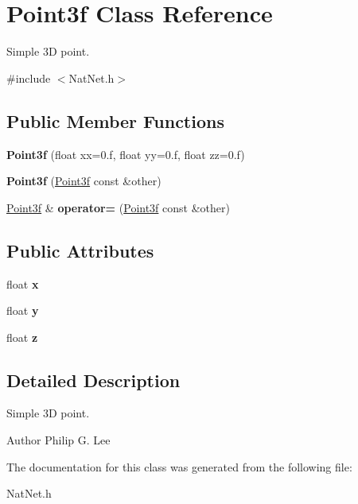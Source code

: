 \hypertarget{classPoint3f}{\section{\-Point3f \-Class \-Reference}
\label{classPoint3f}
}


\-Simple 3\-D point.  




{\ttfamily \#include $<$\-Nat\-Net.\-h$>$}

\subsection*{\-Public \-Member \-Functions}
\begin{DoxyCompactItemize}
\item 
\hypertarget{classPoint3f_a4fa6a4e68ec205c552892694fcef177f}{{\bfseries \-Point3f} (float xx=0.f, float yy=0.f, float zz=0.f)}\label{classPoint3f_a4fa6a4e68ec205c552892694fcef177f}

\item 
\hypertarget{classPoint3f_ae47b8c99eb19855964d305b5b676852d}{{\bfseries \-Point3f} (\hyperlink{classPoint3f}{\-Point3f} const \&other)}\label{classPoint3f_ae47b8c99eb19855964d305b5b676852d}

\item 
\hypertarget{classPoint3f_ac060b6f61dd759362eea8fc9d0507243}{\hyperlink{classPoint3f}{\-Point3f} \& {\bfseries operator=} (\hyperlink{classPoint3f}{\-Point3f} const \&other)}\label{classPoint3f_ac060b6f61dd759362eea8fc9d0507243}

\end{DoxyCompactItemize}
\subsection*{\-Public \-Attributes}
\begin{DoxyCompactItemize}
\item 
\hypertarget{classPoint3f_abfc744e013ce815faa5020f095675dd4}{float {\bfseries x}}\label{classPoint3f_abfc744e013ce815faa5020f095675dd4}

\item 
\hypertarget{classPoint3f_a7fb932f23a99ead4e754df956dd61600}{float {\bfseries y}}\label{classPoint3f_a7fb932f23a99ead4e754df956dd61600}

\item 
\hypertarget{classPoint3f_a572109d412d2499243ce3136b7f8c682}{float {\bfseries z}}\label{classPoint3f_a572109d412d2499243ce3136b7f8c682}

\end{DoxyCompactItemize}


\subsection{\-Detailed \-Description}
\-Simple 3\-D point. 

\begin{DoxyAuthor}{\-Author}
\-Philip \-G. \-Lee 
\end{DoxyAuthor}


\-The documentation for this class was generated from the following file\-:\begin{DoxyCompactItemize}
\item 
\-Nat\-Net.\-h\end{DoxyCompactItemize}
